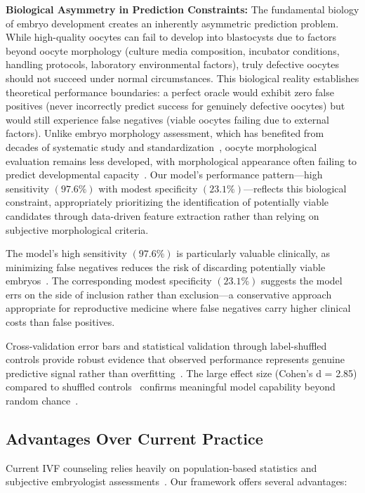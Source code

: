 \textbf{Biological Asymmetry in Prediction Constraints:} The fundamental biology of embryo development creates an inherently asymmetric prediction problem. While high-quality oocytes can fail to develop into blastocysts due to factors beyond oocyte morphology (culture media composition, incubator conditions, handling protocols, laboratory environmental factors), truly defective oocytes should not succeed under normal circumstances. This biological reality establishes theoretical performance boundaries: a perfect oracle would exhibit zero false positives (never incorrectly predict success for genuinely defective oocytes) but would still experience false negatives (viable oocytes failing due to external factors). Unlike embryo morphology assessment, which has benefited from decades of systematic study and standardization~\cite{racowsky2010standardization}, oocyte morphological evaluation remains less developed, with morphological appearance often failing to predict developmental capacity~\cite{reader2022high}. Our model's performance pattern—high sensitivity $(97.6\%)$ with modest specificity $(23.1\%)$—reflects this biological constraint, appropriately prioritizing the identification of potentially viable candidates through data-driven feature extraction rather than relying on subjective morphological criteria.

The model's high sensitivity $(97.6\%)$ is particularly valuable clinically, as minimizing false negatives reduces the risk of discarding potentially viable embryos~\cite{cutting2008elective}. The corresponding modest specificity $(23.1\%)$ suggests the model errs on the side of inclusion rather than exclusion—a conservative approach appropriate for reproductive medicine where false negatives carry higher clinical costs than false positives.

Cross-validation error bars and statistical validation through label-shuffled controls provide robust evidence that observed performance represents genuine predictive signal rather than overfitting~\cite{hastie2009elements}. The large effect size (Cohen's d = 2.85) compared to shuffled controls~\cite{cohen1988statistical} confirms meaningful model capability beyond random chance~\cite{mann1947test}.

\subsection{Advantages Over Current Practice}

Current IVF counseling relies heavily on population-based statistics and subjective embryologist assessments~\cite{asrm2017embryo,racowsky2010standardization}. Our framework offers several advantages:

